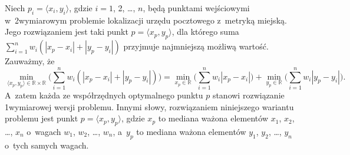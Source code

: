 \noindent Niech $p_i=\langle x_i,y_i\rangle$, gdzie $i=1$, 2, \dots, $n$, będą punktami wejściowymi w~2\nbhyphen wymiarowym problemie lokalizacji urzędu pocztowego z~metryką miejską.
Jego rozwiązaniem jest taki punkt $p=\langle x_p,y_p\rangle$, dla którego suma $\sum_{i=1}^nw_i(|x_p-x_i|+|y_p-y_i|)$ przyjmuje najmniejszą możliwą wartość.
Zauważmy, że
\[
    \min_{\langle x_p,y_p\rangle\in\mathbb{R}\times\mathbb{R}}\biggl(\sum_{i=1}^nw_i(|x_p-x_i|+|y_p-y_i|)\biggr) = \min_{x_p\in\mathbb{R}}\biggl(\sum_{i=1}^nw_i|x_p-x_i|\biggr)+\min_{y_p\in\mathbb{R}}\biggl(\sum_{i=1}^nw_i|y_p-y_i|\biggr).
\]
A~zatem każda ze współrzędnych optymalnego punktu $p$ stanowi rozwiązanie 1\nbhyphen wymiarowej wersji problemu.
Innymi słowy, rozwiązaniem niniejszego wariantu problemu jest punkt $p=\langle x_p,y_p\rangle$, gdzie $x_p$ to mediana ważona elementów $x_1$, $x_2$, \dots, $x_n$ o~wagach $w_1$, $w_2$, \dots, $w_n$, a~$y_p$ to mediana ważona elementów $y_1$, $y_2$, \dots, $y_n$ o~tych samych wagach.
